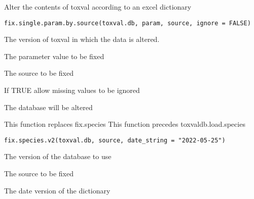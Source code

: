 \documentclass[letterpaper]{book}
\begin{document}
%
\begin{Description}\relax
Alter the contents of toxval according to an excel dictionary
\end{Description}
%
\begin{Usage}
\begin{verbatim}
fix.single.param.by.source(toxval.db, param, source, ignore = FALSE)
\end{verbatim}
\end{Usage}
%
\begin{Arguments}
\begin{ldescription}
\item[\code{toxval.db}] The version of toxval in which the data is altered.

\item[\code{param}] The parameter value to be fixed

\item[\code{source}] The source to be fixed

\item[\code{ignore}] If TRUE allow missing values to be ignored
\end{ldescription}
\end{Arguments}
%
\begin{Value}
The database will be altered
\end{Value}
%
\begin{Description}\relax
This function replaces fix.species
This function precedes toxvaldb.load.species
\end{Description}
%
\begin{Usage}
\begin{verbatim}
fix.species.v2(toxval.db, source, date_string = "2022-05-25")
\end{verbatim}
\end{Usage}
%
\begin{Arguments}
\begin{ldescription}
\item[\code{toxval.db}] The version of the database to use

\item[\code{source}] The source to be fixed

\item[\code{date\_string}] The date version of the dictionary
\end{ldescription}
\end{Arguments}
\end{document}

